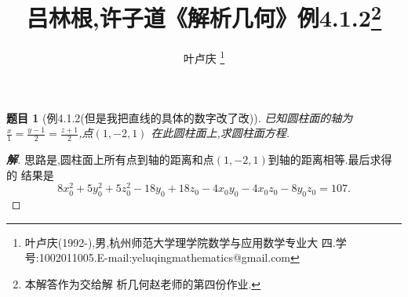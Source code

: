 ﻿\documentclass[a4paper]{article}
\newtheorem*{exe}{题目}
\newenvironment{exercise}
{\bigskip\begin{mdframed}\begin{exe}}
    {\end{exe}\end{mdframed}\bigskip}
\numberwithin{equation}{section}
\begin{document}
\title{{\bf{吕林根,许子道《解析几何》例4.1.2\footnote{本解答作为交给解
        析几何赵老师的第四份作业.}}}} \author{\small{叶卢庆
    \footnote{叶卢庆(1992-),男,杭州师范大学理学院数学与应用数学专业大
      四.学号:1002011005.E-mail:yeluqingmathematics@gmail.com}}}
\maketitle
\begin{exercise}[例4.1.2(但是我把直线的具体的数字改了改)]
已知圆柱面的轴为$\frac{x}{1}=\frac{y-1}{2}=\frac{z+1}{2}$,点$(1,-2,1)$
在此圆柱面上,求圆柱面方程.
\end{exercise}
\begin{proof}[\textbf{解}]
思路是,圆柱面上所有点到轴的距离和点$(1,-2,1)$到轴的距离相等.最后求得的
结果是
$$
8x_0^2+5y_0^2+5z_0^2-18y_0+18z_0-4x_0y_0-4x_0z_0-8y_0z_0=107.
$$
\end{proof}
\end{document}
